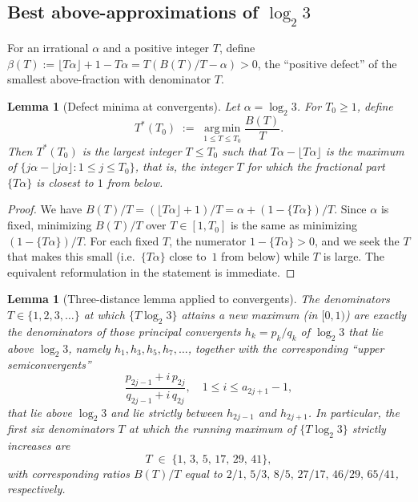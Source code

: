 \documentclass[11pt,a4paper]{article}
\newtheorem{lemma}[theorem]{Lemma}
\theoremstyle{definition}
\theoremstyle{remark}
\begin{document}
\subsection{Best above-approximations of $\log_2 3$}

For an irrational $\alpha$ and a positive integer $T$, define
$\beta(T) := \lfloor T \alpha \rfloor + 1 - T \alpha = T (B(T)/T -
\alpha) > 0$, the ``positive defect'' of the smallest above-fraction
with denominator $T$.

\begin{lemma}[Defect minima at convergents]\label{lem:defect}
Let $\alpha = \log_2 3$.  For $T_0 \geq 1$, define
\[
  T^{*}(T_0) \;:=\; \operatorname*{arg\,min}_{1 \leq T \leq T_0} \frac{B(T)}{T}.
\]
Then $T^{*}(T_0)$ is the largest integer $T \leq T_0$ such that
$T \alpha - \lfloor T \alpha \rfloor$ is the maximum of
$\{j \alpha - \lfloor j \alpha \rfloor : 1 \leq j \leq T_0\}$, that
is, the integer $T$ for which the fractional part $\{T \alpha\}$ is
closest to $1$ from below.
\end{lemma}

\begin{proof}
We have $B(T)/T = (\lfloor T \alpha \rfloor + 1)/T = \alpha + (1 -
\{T \alpha\})/T$.  Since $\alpha$ is fixed, minimizing $B(T)/T$ over
$T \in [1, T_0]$ is the same as minimizing $(1 - \{T \alpha\})/T$.
For each fixed $T$, the numerator $1 - \{T \alpha\} > 0$, and we
seek the $T$ that makes this small (i.e.\ $\{T\alpha\}$ close to~$1$
from below) while $T$ is large.  The equivalent reformulation in the
statement is immediate.
\end{proof}

\begin{lemma}[Three-distance lemma applied to convergents]
\label{lem:bestabove}
The denominators $T \in \{1, 2, 3, \ldots\}$ at which $\{T \log_2 3\}$
attains a new maximum (in $[0, 1)$) are exactly the denominators of
those principal convergents $h_k = p_k/q_k$ of $\log_2 3$ that lie
\emph{above} $\log_2 3$, namely $h_1, h_3, h_5, h_7, \ldots$, together
with the corresponding ``upper semiconvergents''
\[
  \frac{p_{2j-1} + i \, p_{2j}}{q_{2j-1} + i \, q_{2j}},
  \quad 1 \leq i \leq a_{2j+1} - 1,
\]
that lie above $\log_2 3$ and lie strictly between $h_{2j-1}$ and
$h_{2j+1}$.  In particular, the first six denominators $T$ at which
the running maximum of $\{T \log_2 3\}$ strictly increases are
\[
  T \;\in\; \{1,\, 3,\, 5,\, 17,\, 29,\, 41\},
\]
with corresponding ratios $B(T)/T$ equal to
$2/1,\, 5/3,\, 8/5,\, 27/17,\, 46/29,\, 65/41$, respectively.
\end{lemma}
\end{document}
